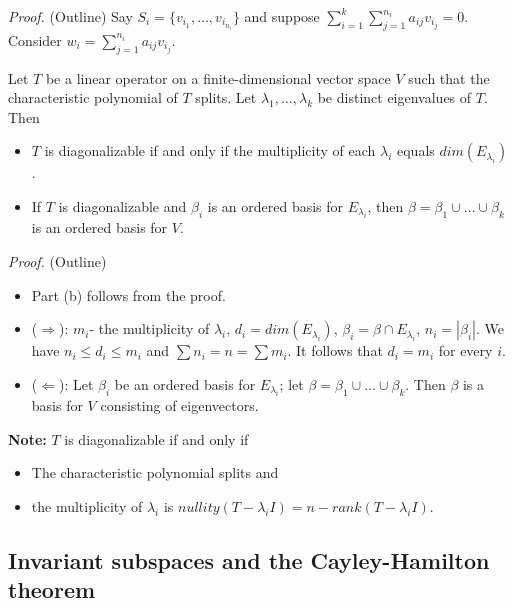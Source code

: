 \documentclass[12pt]{article}
\newenvironment{theorem}[2][Theorem]{\begin{trivlist}
\item[\hskip \labelsep {\bfseries #1}\hskip \labelsep {\bfseries #2.}]}{\end{trivlist}}
\begin{document}
\textit{Proof.} (Outline)
Say $S_i = \{v_{i_1}, \dots, v_{i_{n_i}}\}$ and suppose $\sum_{i = 1}^k\sum_{j = 1}^{n_i}a_{ij}v_{i_j} = 0$. Consider $w_i = \sum_{j = 1}^{n_i}a_{ij}v_{i_j}$.

\begin{theorem}{5.9}
Let $T$ be a linear operator on a finite-dimensional vector space $V$ such that the characteristic polynomial of $T$ splits. Let $\lambda_1, \dots, \lambda_k$ be distinct eigenvalues of $T$. Then

\begin{itemize}
    \item[(a)] $T$ is diagonalizable if and only if the multiplicity of each $\lambda_i$ equals $dim(E_{\lambda_i})$.
    
    \item[(b)] If $T$ is diagonalizable and $\beta_i$ is an ordered basis for $E_{\lambda_i}$, then $\beta = \beta_1 \cup \dots \cup \beta_k$ is an ordered basis for $V$.
\end{itemize}
\end{theorem}

\textit{Proof.} (Outline)
\begin{itemize}
    \item Part (b) follows from the proof.
    
    \item ($\Longrightarrow$): $m_i$- the multiplicity of $\lambda_i$, $d_i = dim(E_{\lambda_i})$, $\beta_i = \beta \cap E_{\lambda_i}$, $n_i = | \beta_i |$. We have $n_i \leq d_i \leq m_i$ and $\sum n_i = n = \sum m_i$. It follows that $d_i = m_i$ for every $i$.
    
    \item ($\Longleftarrow$): Let $\beta_i$ be an ordered basis for $E_{\lambda_i}$; let $\beta = \beta_1 \cup \dots \cup \beta_k$. Then $\beta$ is a basis for $V$ consisting of eigenvectors.
\end{itemize}

\noindent \textbf{Note:} $T$ is diagonalizable if and only if 
\begin{itemize}
    \item The characteristic polynomial splits and
    \item the multiplicity of $\lambda_i$ is $nullity(T - \lambda_iI) = n - rank(T - \lambda_iI)$.
\end{itemize}

\setcounter{subsection}{3}

\subsection{Invariant subspaces and the Cayley-Hamilton theorem}
\end{document}
